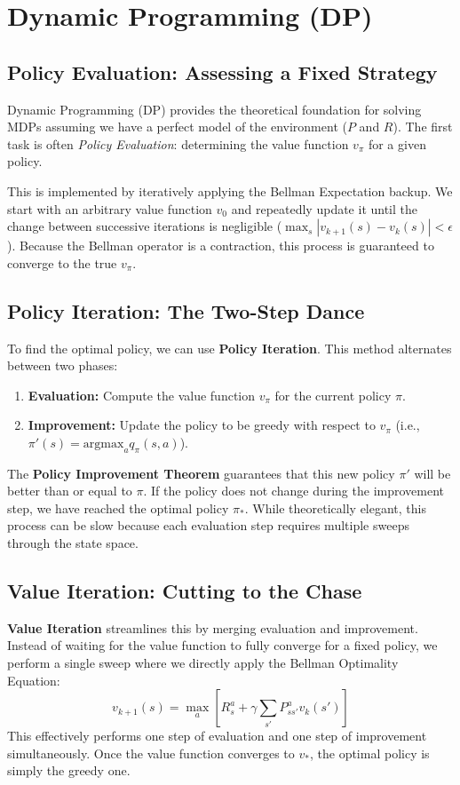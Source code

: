 \section{Dynamic Programming (DP)}

\subsection{Policy Evaluation: Assessing a Fixed Strategy}
Dynamic Programming (DP) provides the theoretical foundation for solving MDPs assuming we have a perfect model of the environment ($P$ and $R$). The first task is often \textit{Policy Evaluation}: determining the value function $v_\pi$ for a given policy. 

This is implemented by iteratively applying the Bellman Expectation backup. We start with an arbitrary value function $v_0$ and repeatedly update it until the change between successive iterations is negligible ($\max_s |v_{k+1}(s) - v_k(s)| < \epsilon$). Because the Bellman operator is a contraction, this process is guaranteed to converge to the true $v_\pi$.

\subsection{Policy Iteration: The Two-Step Dance}
To find the optimal policy, we can use \textbf{Policy Iteration}. This method alternates between two phases:
\begin{enumerate}
    \item \textbf{Evaluation:} Compute the value function $v_\pi$ for the current policy $\pi$.
    \item \textbf{Improvement:} Update the policy to be greedy with respect to $v_\pi$ (i.e., $\pi'(s) = \text{argmax}_a q_\pi(s, a)$).
\end{enumerate}
The \textbf{Policy Improvement Theorem} guarantees that this new policy $\pi'$ will be better than or equal to $\pi$. If the policy does not change during the improvement step, we have reached the optimal policy $\pi_*$. While theoretically elegant, this process can be slow because each evaluation step requires multiple sweeps through the state space.

\subsection{Value Iteration: Cutting to the Chase}
\textbf{Value Iteration} streamlines this by merging evaluation and improvement. Instead of waiting for the value function to fully converge for a fixed policy, we perform a single sweep where we directly apply the Bellman Optimality Equation:
\[ v_{k+1}(s) = \max_a [ R_s^a + \gamma \sum_{s'} P_{ss'}^a v_k(s') ] \]
This effectively performs one step of evaluation and one step of improvement simultaneously. Once the value function converges to $v_*$, the optimal policy is simply the greedy one.

